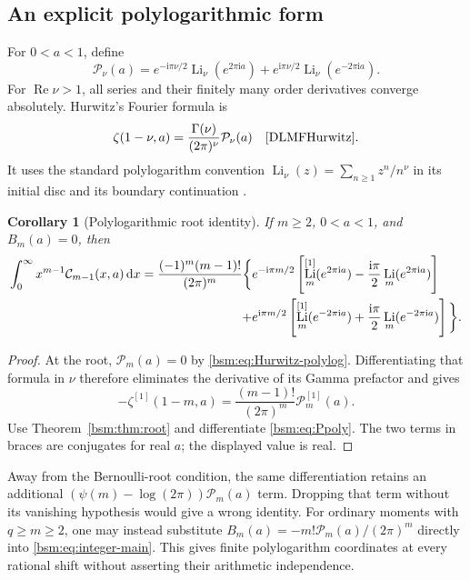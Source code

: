\documentclass[11pt,letterpaper]{article}
\numberwithin{equation}{section}
\newtheorem{corollary}[theorem]{Corollary}
\theoremstyle{definition}\newtheorem{definition}[theorem]{Definition}
\theoremstyle{remark}\newtheorem{remark}[theorem]{Remark}
\DeclareMathOperator{\Li}{Li}
\DeclareMathOperator{\Ree}{Re}
\newcommand{\dd}{\,\mathrm{d}}
\newcommand{\ii}{\mathrm{i}}
\newcommand{\Ccal}{\mathcal C}
\begin{document}
\subsection{An explicit polylogarithmic form}
For $0<a<1$, define
\begin{equation}\label{bsm:eq:Ppoly}
 \mathcal P_\nu(a)=
 e^{-\ii\pi\nu/2}\Li_\nu(e^{2\pi\ii a})
 +e^{\ii\pi\nu/2}\Li_\nu(e^{-2\pi\ii a}).
\end{equation}
For $\Ree\nu>1$, all series and their finitely many order derivatives
converge absolutely. Hurwitz's Fourier formula is
\begin{equation}\label{bsm:eq:Hurwitz-polylog}
 \zeta(1-\nu,a)=\frac{\Gamma(\nu)}{(2\pi)^\nu}\mathcal P_\nu(a)
 \quad\cite[25.11.9]{DLMFHurwitz}.
\end{equation}
It uses the standard polylogarithm convention
$\Li_\nu(z)=\sum_{n\ge1}z^n/n^\nu$ in its initial disc and its
boundary continuation \cite{DLMFPolylog}.

\begin{corollary}[Polylogarithmic root identity]\label{bsm:cor:root-polylog}
If $m\ge2$, $0<a<1$, and $B_m(a)=0$, then
\begin{align}\label{bsm:eq:polylog-root}
 \int_0^\infty x^{m-1}\Ccal_{m-1}(x,a)\dd x
 =\frac{(-1)^m(m-1)!}{(2\pi)^m}
 \bigg\{&e^{-\ii\pi m/2}
   \left[\Li_m^{[1]}(e^{2\pi\ii a})
                 -\frac{\ii\pi}{2}\Li_m(e^{2\pi\ii a})\right]\notag\\
 +&e^{\ii\pi m/2}
   \left[\Li_m^{[1]}(e^{-2\pi\ii a})
                 +\frac{\ii\pi}{2}\Li_m(e^{-2\pi\ii a})\right]\bigg\}.
\end{align}
\end{corollary}
\begin{proof}
At the root, $\mathcal P_m(a)=0$ by
\eqref{bsm:eq:Hurwitz-polylog}. Differentiating that formula in $\nu$
therefore eliminates the derivative of its Gamma prefactor and gives
\[
 -\zeta^{[1]}(1-m,a)=\frac{(m-1)!}{(2\pi)^m}
                         \mathcal P_m^{[1]}(a).
\]
Use Theorem~\ref{bsm:thm:root} and differentiate
\eqref{bsm:eq:Ppoly}. The two terms in braces are conjugates for real $a$;
the displayed value is real.
\end{proof}

Away from the Bernoulli-root condition, the same differentiation
retains an additional $(\psi(m)-\log(2\pi))\mathcal P_m(a)$ term.
Dropping that term without its vanishing hypothesis would give a
wrong identity. For ordinary moments with $q\ge m\ge2$, one may
instead substitute
$B_m(a)=-m!\mathcal P_m(a)/(2\pi)^m$ directly into
\eqref{bsm:eq:integer-main}. This gives finite polylogarithm coordinates
at every rational shift without asserting their arithmetic independence.
\end{document}
